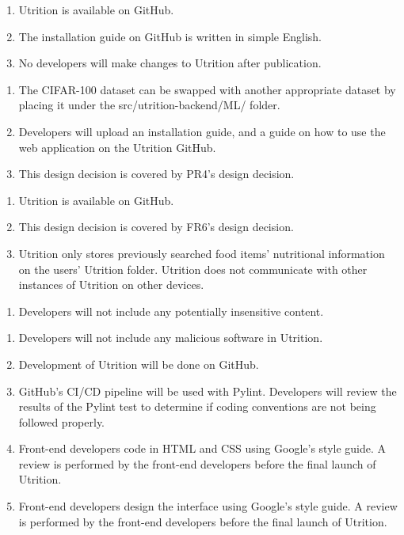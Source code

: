 \documentclass[12pt, titlepage]{article}
\begin{document}
\begin{enumerate}[{OE}1. ]
	\item Utrition is available on GitHub.
	\item The installation guide on GitHub is written in simple English.
	\item No developers will make changes to Utrition after publication.
\end{enumerate}

\begin{enumerate}[{MS}1. ]
	\item The CIFAR-100 dataset can be swapped with another appropriate dataset by placing it under the src/utrition-backend/ML/ folder.
	\item Developers will upload an installation guide, and a guide on how to use the web application on the Utrition GitHub.
	\item This design decision is covered by PR4's design decision.
\end{enumerate}

\begin{enumerate}[{SR}1. ]
	\item Utrition is available on GitHub.
	\item This design decision is covered by FR6's design decision.
	\item Utrition only stores previously searched food items’ nutritional information on the users’ Utrition folder. Utrition does not communicate with other instances of Utrition on other devices.
\end{enumerate}

\begin{enumerate}[{CP}1. ]
	\item Developers will not include any potentially insensitive content.
\end{enumerate}	

\begin{enumerate}[{LR}1. ]
	\item Developers will not include any malicious software in Utrition.
	\item Development of Utrition will be done on GitHub.
	\item GitHub’s CI/CD pipeline will be used with Pylint. Developers will review the results of the Pylint test to determine if coding conventions are not being followed properly.
	\item Front-end developers code in HTML and CSS using Google’s style guide. A review is performed by the front-end developers before the final launch of Utrition.
	\item Front-end developers design the interface using Google’s style guide. A review is performed by the front-end developers before the final launch of Utrition.
\end{enumerate}	
\end{document}
